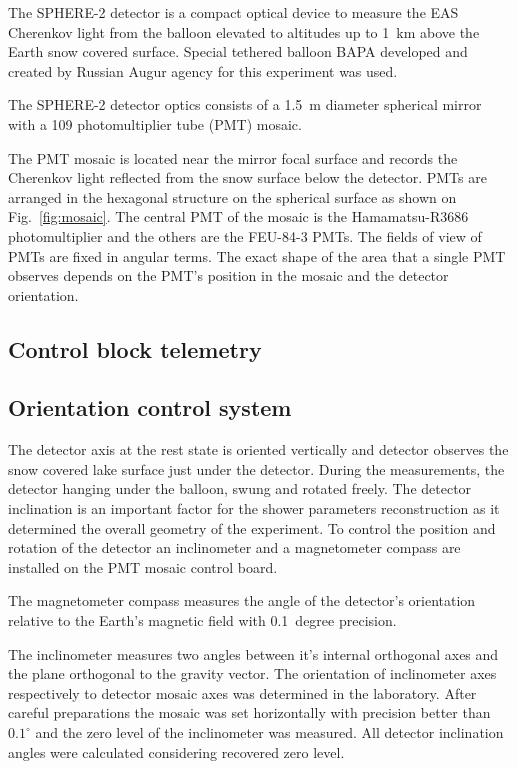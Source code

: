 \documentclass[final,5p,times,twocolumn]{elsarticle}
\begin{document}
The \mbox{SPHERE-2} detector is a compact optical device to measure the EAS Cherenkov light from the balloon elevated to altitudes up to 1~km above the Earth snow covered surface. Special tethered balloon BAPA developed and created by Russian Augur agency for this experiment was used.

The \mbox{SPHERE-2} detector optics consists of a 1.5~m diameter spherical mirror with a 109 photomultiplier tube (PMT) mosaic. 

The PMT mosaic is located near the mirror focal surface and records the Cherenkov light reflected from the snow surface below the detector. PMTs are arranged in the hexagonal structure on the spherical surface as shown on Fig.~\ref{fig:mosaic}. The central PMT of the mosaic is the Hamamatsu-R3686 photomultiplier and the others are the FEU-84-3 PMTs. The fields of view of PMTs are fixed in angular terms. The exact shape of the area that a single PMT observes depends on the PMT's position in the mosaic and the detector orientation.



\subsection{Control block telemetry}

\subsection{Orientation control system}

The detector axis at the rest state is oriented vertically and detector observes the snow covered lake surface just under the detector. During the measurements, the detector hanging under the balloon, swung and rotated freely. The detector inclination is an important factor for the shower parameters reconstruction as it determined the overall geometry of the experiment. To control the position and rotation of the detector an inclinometer and a magnetometer compass are installed on the PMT mosaic control board. 

The magnetometer compass measures the angle of the detector's orientation relative to the Earth's magnetic field with 0.1~degree precision.

The inclinometer measures two angles between it's internal orthogonal axes and the plane orthogonal to the gravity vector. The orientation of inclinometer axes respectively to detector mosaic axes was determined in the laboratory. After careful preparations the mosaic was set horizontally with precision better than $0.1^\circ$ and the zero level of the inclinometer was measured. All detector inclination angles were calculated considering recovered zero level.
\end{document}

